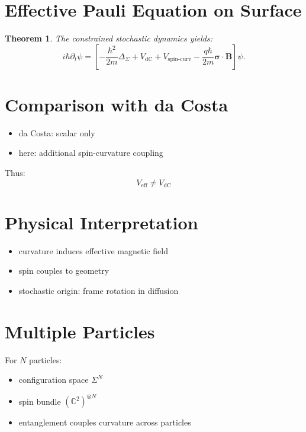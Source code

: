 \documentclass[11pt]{article}
\newtheorem{theorem}{Theorem}
\begin{document}
\section{Effective Pauli Equation on Surface}

\begin{theorem}
The constrained stochastic dynamics yields:
\begin{equation}
i\hbar \partial_t \psi =
\left[
-\frac{\hbar^2}{2m}\Delta_\Sigma
+ V_{\text{dC}}
+ V_{\text{spin-curv}}
- \frac{q\hbar}{2m}\bm{\sigma}\cdot \mathbf{B}
\right]\psi.
\end{equation}
\end{theorem}

\section{Comparison with da Costa}

\begin{itemize}
\item da Costa: scalar only
\item here: additional spin-curvature coupling
\end{itemize}

Thus:
\begin{equation}
V_{\text{eff}} \neq V_{\text{dC}}
\end{equation}

\section{Physical Interpretation}

\begin{itemize}
\item curvature induces effective magnetic field
\item spin couples to geometry
\item stochastic origin: frame rotation in diffusion
\end{itemize}

\section{Multiple Particles}

For $N$ particles:

\begin{itemize}
\item configuration space $\Sigma^N$
\item spin bundle $(\mathbb{C}^2)^{\otimes N}$
\item entanglement couples curvature across particles
\end{itemize}
\end{document}
